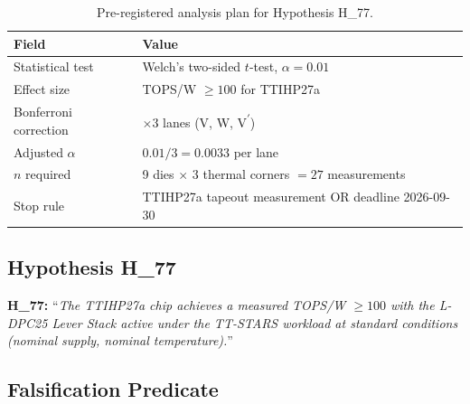 \begin{table}[ht]
  \centering
  \caption{Pre-registered analysis plan for Hypothesis H\_77.}
  \label{tab:preregistration}
  \begin{tabular}{ll}
    \toprule
    \textbf{Field} & \textbf{Value} \\
    \midrule
    Statistical test   & Welch's two-sided $t$-test, $\alpha = 0.01$ \\
    Effect size        & TOPS/W $\geq 100$ for TTIHP27a \\
    Bonferroni correction & $\times 3$ lanes (V, W, V\textsuperscript{$\prime$}) \\
    Adjusted $\alpha$  & $0.01 / 3 = 0.0033$ per lane \\
    $n$ required       & 9 dies $\times$ 3 thermal corners $= 27$ measurements \\
    Stop rule          & TTIHP27a tapeout measurement OR deadline 2026-09-30 \\
    \bottomrule
  \end{tabular}
\end{table}

\subsection{Hypothesis H\_77}

\begin{definition}[Hypothesis H\_77]
  \label{def:h77}
  \textrm{\textbf{H\_77:}} ``\emph{The TTIHP27a chip achieves a measured
  TOPS/W $\geq 100$ with the L-DPC25 Lever Stack active under the
  TT-STARS workload at standard conditions (nominal supply, nominal temperature).}''
\end{definition}

\subsection{Falsification Predicate}

